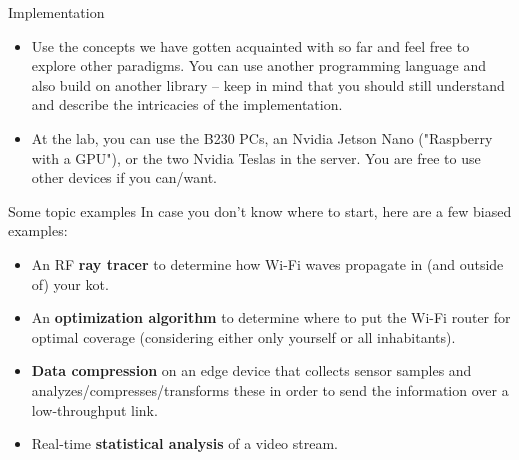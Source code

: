 \documentclass[11pt,t]{beamer}
\begin{document}
\begin{frame}{Implementation} 

\begin{itemize}\setlength\itemsep{0.75em}
\item Use the concepts we have gotten acquainted with so far and feel free to explore other paradigms. You can use another programming language and also build on another library -- keep in mind that you should still understand and describe the intricacies of the implementation.
\item At the lab, you can use the B230 PCs, an Nvidia Jetson Nano ("Raspberry with a GPU"), or the two Nvidia Teslas in the server. You are free to use other devices if you can/want.
\end{itemize}

\end{frame}


\begin{frame}{Some topic examples} 
In case you don't know where to start, here are a few biased examples:
\vspace{2mm}
\begin{itemize}\setlength\itemsep{0.5em}
    \item An RF \textbf{ray tracer} to determine how Wi-Fi waves propagate in (and outside of) your kot.
    \item An \textbf{optimization algorithm} to determine where to put the Wi-Fi router for optimal coverage (considering either only yourself or all inhabitants).
    \item \textbf{Data compression} on an edge device that collects sensor samples and analyzes/compresses/transforms these in order to send the information over a low-throughput link.
    \item Real-time \textbf{statistical analysis} of a video stream.
\end{itemize}
\end{frame}
\end{document}
